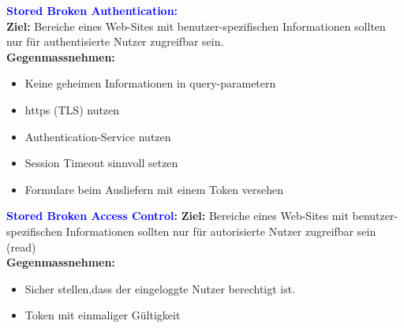 \textbf{\textcolor{blue}{Stored Broken Authentication:}}\\
\textbf{Ziel:} Bereiche eines Web-Sites mit benutzer-spezifischen Informationen sollten nur für authentisierte Nutzer zugreifbar sein.\\
\textbf{Gegenmassnehmen:}
\begin{itemize}[topsep=0pt, leftmargin=3mm]
    \setlength\itemsep{-0.3em}
    \item Keine geheimen Informationen in query-parametern
    \item https (TLS) nutzen
    \item Authentication-Service nutzen
    \item Session Timeout sinnvoll setzen
    \item Formulare beim Ausliefern mit einem Token versehen
\end{itemize}
\textbf{\textcolor{blue}{Stored Broken Access Control:}}
\textbf{Ziel:} Bereiche eines Web-Sites mit benutzer-spezifischen Informationen sollten nur für autorisierte Nutzer zugreifbar sein (read)\\
\textbf{Gegenmassnehmen:}
\begin{itemize}[topsep=0pt, leftmargin=3mm]
    \setlength\itemsep{-0.3em}
    \item Sicher stellen,dass der eingeloggte Nutzer berechtigt ist.
    \item Token mit einmaliger Gültigkeit
\end{itemize}